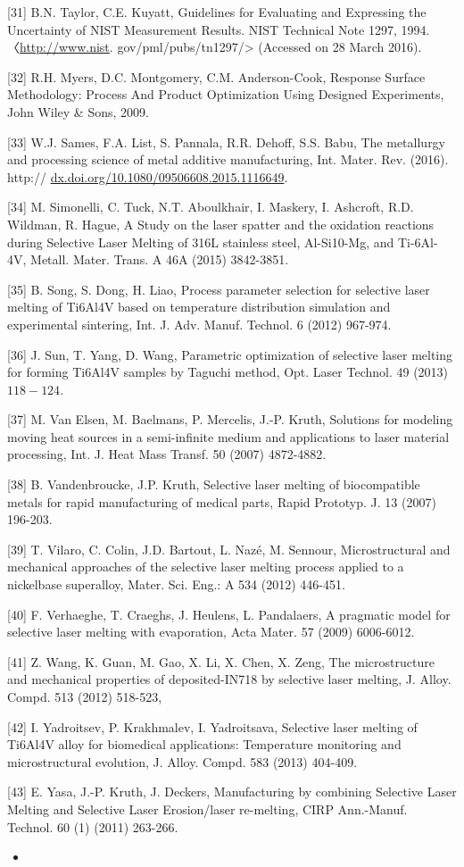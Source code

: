 \documentclass[10pt]{article}
\begin{document}
[31] B.N. Taylor, C.E. Kuyatt, Guidelines for Evaluating and Expressing the Uncertainty of NIST Measurement Results. NIST Technical Note 1297, 1994. 〈\href{http://www.nist}{http://www.nist}. gov/pml/pubs/tn1297/> (Accessed on 28 March 2016).

[32] R.H. Myers, D.C. Montgomery, C.M. Anderson-Cook, Response Surface Methodology: Process And Product Optimization Using Designed Experiments, John Wiley \& Sons, 2009.

[33] W.J. Sames, F.A. List, S. Pannala, R.R. Dehoff, S.S. Babu, The metallurgy and processing science of metal additive manufacturing, Int. Mater. Rev. (2016). http:// \href{http://dx.doi.org/10.1080/09506608.2015.1116649}{dx.doi.org/10.1080/09506608.2015.1116649}.

[34] M. Simonelli, C. Tuck, N.T. Aboulkhair, I. Maskery, I. Ashcroft, R.D. Wildman, R. Hague, A Study on the laser spatter and the oxidation reactions during Selective Laser Melting of 316L stainless steel, Al-Si10-Mg, and Ti-6Al-4V, Metall. Mater. Trans. A 46A (2015) 3842-3851.

[35] B. Song, S. Dong, H. Liao, Process parameter selection for selective laser melting of Ti6Al4V based on temperature distribution simulation and experimental sintering, Int. J. Adv. Manuf. Technol. 6 (2012) 967-974.

[36] J. Sun, T. Yang, D. Wang, Parametric optimization of selective laser melting for forming Ti6Al4V samples by Taguchi method, Opt. Laser Technol. 49 (2013) $118-124$.

[37] M. Van Elsen, M. Baelmans, P. Mercelis, J.-P. Kruth, Solutions for modeling moving heat sources in a semi-infinite medium and applications to laser material processing, Int. J. Heat Mass Transf. 50 (2007) 4872-4882.

[38] B. Vandenbroucke, J.P. Kruth, Selective laser melting of biocompatible metals for rapid manufacturing of medical parts, Rapid Prototyp. J. 13 (2007) 196-203.

[39] T. Vilaro, C. Colin, J.D. Bartout, L. Nazé, M. Sennour, Microstructural and mechanical approaches of the selective laser melting process applied to a nickelbase superalloy, Mater. Sci. Eng.: A 534 (2012) 446-451.

[40] F. Verhaeghe, T. Craeghs, J. Heulens, L. Pandalaers, A pragmatic model for selective laser melting with evaporation, Acta Mater. 57 (2009) 6006-6012.

[41] Z. Wang, K. Guan, M. Gao, X. Li, X. Chen, X. Zeng, The microstructure and mechanical properties of deposited-IN718 by selective laser melting, J. Alloy. Compd. 513 (2012) 518-523,

[42] I. Yadroitsev, P. Krakhmalev, I. Yadroitsava, Selective laser melting of Ti6Al4V alloy for biomedical applications: Temperature monitoring and microstructural evolution, J. Alloy. Compd. 583 (2013) 404-409.

[43] E. Yasa, J.-P. Kruth, J. Deckers, Manufacturing by combining Selective Laser Melting and Selective Laser Erosion/laser re-melting, CIRP Ann.-Manuf. Technol. 60 (1) (2011) 263-266.

\begin{itemize}
  \item 
\end{itemize}
\end{document}
